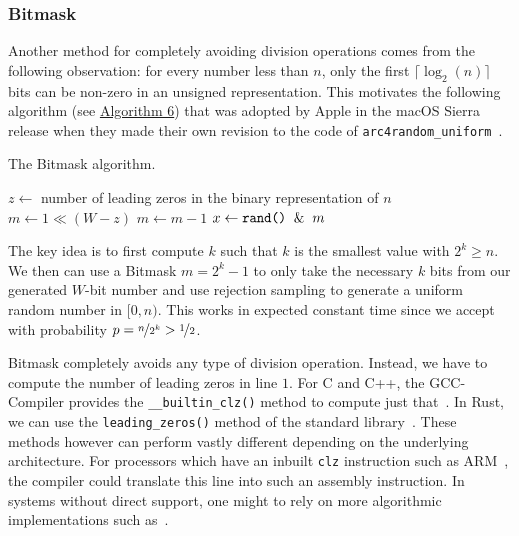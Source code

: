 \documentclass[a4paper, UKenglish, cleveref, autoref, thm-restate]{lipics-v2021}
\begin{document}
\subsubsection{Bitmask}\label{sec:2.2.4}
Another method for completely avoiding division operations comes from the following observation:
for every number less than $n$, only the first $\lceil\log_2(n)\rceil$ bits can be non-zero in an unsigned representation.
This motivates the following algorithm (see \hyperref[alg:bitmask]{Algorithm 6}) that was adopted by Apple in the macOS Sierra release when they made their own revision to the code of \texttt{arc4random\_uniform}~\cite{Apple}.

\begin{algorithm}[!htb] \label{alg:bitmask}
    \caption{The Bitmask algorithm.}
    \Require{source of uniformly-distributed random integers in $[0,2^W)$ given by \texttt{rand()}}
    $z \leftarrow$ number of leading zeros in the binary representation of $n$\;
    $m \leftarrow 1 \ll (W - z)$
    $m \leftarrow m - 1$\;
    $x \leftarrow \texttt{rand()} \And m$\;
    \;
\end{algorithm}

The key idea is to first compute $k$ such that $k$ is the smallest value with $2^k \geq n$.
We then can use a Bitmask $m = 2^k - 1$ to only take the necessary $k$ bits from our generated $W$-bit number and use rejection sampling to generate a uniform random number in $[0,n)$.
This works in expected constant time since we accept with probability $p = \nicefrac{n}{2^k} > \nicefrac{1}{2}$.

Bitmask completely avoids any type of division operation.
Instead, we have to compute the number of leading zeros in line $1$.
For C and C++, the GCC-Compiler provides the \texttt{\_\_builtin\_clz()} method to compute just that~\cite{GccCLZ}.
In Rust, we can use the \texttt{leading\_zeros()} method of the standard library~\cite{RustCLZ}.
These methods however can perform vastly different depending on the underlying architecture.
For processors which have an inbuilt \texttt{clz} instruction such as ARM~\cite{ArmCLZ}, the compiler could translate this line into such an assembly instruction.
In systems without direct support, one might to rely on more algorithmic implementations such as~\cite{ImplCLZ, HackersDelight}.
\end{document}
